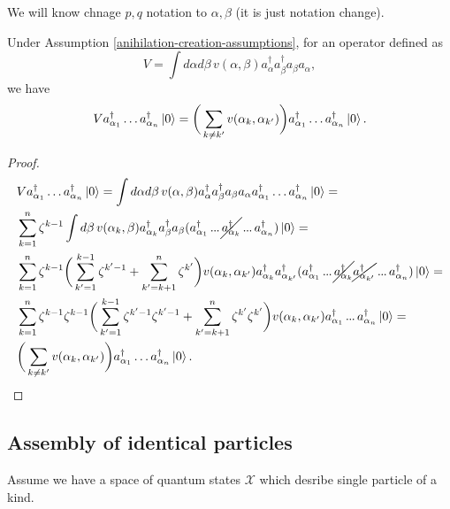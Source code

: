 \documentclass[main.tex]{subfiles}
\begin{document}
We will know chnage $p, q$ notation to $\alpha, \beta$ (it is just notation change).

\begin{proposition}
Under Assumption \ref{anihilation-creation-assumptions}, for an operator defined as
\begin{equation}
V = \int d\alpha d\beta\, v(\alpha, \beta) a_{\alpha}^\dagger a_{\beta}^\dagger a_{\beta} a_{\alpha},
\end{equation}
we have
\begin{equation}
V a^\dagger_{\alpha_1} \dots a^\dagger_{\alpha_n}\ket{0} = \bigg(\sum_{k\not=k'}v(\alpha_k, \alpha_{k'})\bigg) a^\dagger_{\alpha_1} \dots a^\dagger_{\alpha_n}\ket{0}.
\end{equation}
\end{proposition}
\begin{proof}
\begin{align*}
& V a^\dagger_{\alpha_1} \dots a^\dagger_{\alpha_n}\ket{0} = \int d\alpha d\beta\, v(\alpha, \beta) a_{\alpha}^\dagger a_{\beta}^\dagger a_{\beta} a_{\alpha} a^\dagger_{\alpha_1} \dots a^\dagger_{\alpha_n}\ket{0} = \\
& \sum_{k = 1}^n \zeta^{k - 1} \int d\beta\, v(\alpha_k, \beta)a_{\alpha_k}^\dagger a_{\beta}^\dagger a_{\beta} (a^\dagger_{\alpha_1} \tdots \cancel{a^\dagger_{\alpha_k}} \tdots a^\dagger_{\alpha_n})\ket{0} = \\
& \sum_{k = 1}^n \zeta^{k - 1}\bigg( \sum_{k'=1}^{k - 1} \zeta^{k' - 1}  + \sum_{k'=k+1}^{n} \zeta^{k'}\bigg) v(\alpha_k, \alpha_{k'})a_{\alpha_k}^\dagger a_{\alpha_{k'}}^\dagger (a^\dagger_{\alpha_1} \tdots \cancel{a^\dagger_{\alpha_k}} \cancel{a^\dagger_{\alpha_{k'}}}\tdots a^\dagger_{\alpha_n})\ket{0} = \\
& \sum_{k = 1}^n \zeta^{k-1} \zeta^{k - 1}\bigg( \sum_{k'=1}^{k - 1} \zeta^{k'- 1}\zeta^{k' - 1}  + \sum_{k'=k+1}^{n} \zeta^{k'} \zeta^{k'}\bigg) v(\alpha_k, \alpha_{k'})
a^\dagger_{\alpha_1} \tdots a^\dagger_{\alpha_n}\ket{0} = \\
& \bigg(\sum_{k\not=k'}v(\alpha_k, \alpha_{k'})\bigg) a^\dagger_{\alpha_1} \dots a^\dagger_{\alpha_n}\ket{0}.
\end{align*}
\end{proof}

\subsection{Assembly of identical particles}

Assume we have a space of quantum states $\mathcal{X}$ which desribe single particle of a kind.
\end{document}
